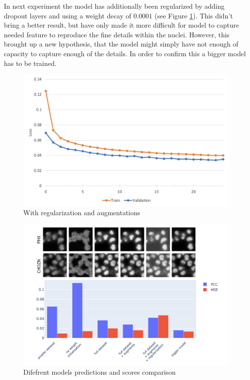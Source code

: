 In next experiment the model has additionally been regularized by adding dropout layers and using a weight decay of $0.0001$ (see Figure \ref{fig:full-dataset-pcc-regularized}). This didn't bring a better result, but have only made it more difficult for model to capture needed feature to reproduce the fine details within the nuclei. However, this brought up a new hypothesis, that the model might simply have not enough of capacity to capture enough of the details. In order to confirm this a bigger model has to be trained.
\begin{figure}[H]
	\begin{center}
		\includegraphics[width=0.5\linewidth]{bilder/nuclei/full-dataset-regularized.jpg}
		\caption{With regularization and augmentations}\label{fig:full-dataset-pcc-regularized}
	\end{center}
\end{figure}

\begin{figure}[H]
	\begin{center}
		\includegraphics[width=0.5\linewidth]{bilder/nuclei/comparison-chzn-phx.png}
		\caption{Difefrent models predictions and scores comparison}\label{fig:nuclei-comparison-predictions}
	\end{center}
\end{figure}

